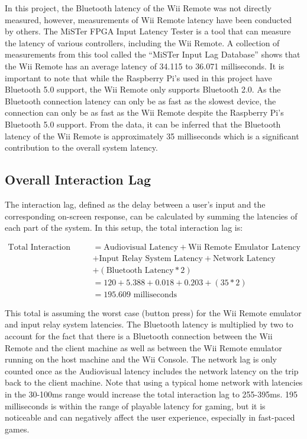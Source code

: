 In this project, the Bluetooth latency of the Wii Remote was not directly
measured, however, measurements of Wii Remote latency have been conducted by
others. The MiSTer FPGA Input Latency Tester\cite{cathoderayblogTestYour} is a
tool that can measure the latency of various controllers, including the Wii
Remote. A collection of measurements from this tool called the ``MiSTer Input
Lag Database''\cite{misterInputLagDatabase} shows that the Wii Remote has an
average latency of 34.115 to 36.071 milliseconds. It is important to note that
while the Raspberry Pi's used in this project have Bluetooth 5.0 support\cite{raspberrypiPi5}, the
Wii Remote only supports Bluetooth 2.0\cite{wikipediaWii}. As the Bluetooth connection latency can
only be as fast as the slowest device, the connection can only be as fast as the
Wii Remote despite the Raspberry Pi's Bluetooth 5.0 support. From the data, it
can be inferred that the Bluetooth latency of the Wii Remote is approximately 35
milliseconds which is a significant contribution to the overall system latency.

\subsection{Overall Interaction Lag}

The interaction lag, defined as the delay between a user’s input and the
corresponding on-screen response\cite{volkerseekerBestPaper}, can be calculated by
summing the latencies of each part of the system. In this setup, the total interaction lag is:

\begin{align*}
  \text{Total Interaction Lag} &= \text{Audiovisual Latency} + \text{Wii Remote Emulator Latency} \\
  &+ \text{Input Relay System Latency} + \text{Network Latency} \\
  &+ (\text{Bluetooth Latency} * 2) \\
  &= 120 + 5.388 + 0.018 + 0.203 + (35 * 2) \\
  &= 195.609 \text{ milliseconds}
\end{align*}

This total is assuming the worst case (button press) for the Wii Remote emulator
and input relay system latencies. The Bluetooth latency is multiplied by two to
account for the fact that there is a Bluetooth connection between the Wii Remote
and the client machine as well as between the Wii Remote emulator running on the
host machine and the Wii Console. The network lag is only counted once as the
Audiovisual latency includes the network latency on the trip back to the client
machine. Note that using a typical home network with latencies in the 30-100ms
range would increase the total interaction lag to 255-395ms. 195 milliseconds is
within the range of playable latency for gaming\cite{latency_playable}, but it is
noticeable and can negatively affect the user experience, especially in fast-paced games\cite{latency_bad}.

